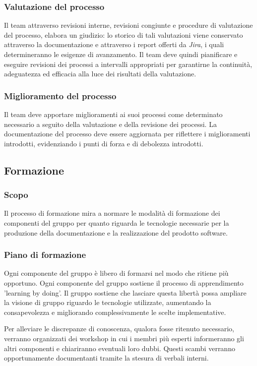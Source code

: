 \documentclass[10pt, a4paper]{article}
\begin{document}
\subsubsection{Valutazione del processo}
Il team attraverso revisioni interne, revisioni congiunte e procedure di valutazione del processo, elabora un giudizio: lo storico di tali valutazioni
viene conservato attraverso la documentazione e attraverso i report offerti da \textit{Jira}, i quali determineranno le esigenze di avanzamento.
Il team deve quindi pianificare e eseguire revisioni dei processi a intervalli appropriati per garantirne la continuità, adeguatezza ed efficacia alla 
luce dei risultati della valutazione.

\subsubsection{Miglioramento del processo}
Il team deve apportare miglioramenti ai suoi processi come determinato necessario a seguito della valutazione e della revisione dei processi.
La documentazione del processo deve essere aggiornata per riflettere i miglioramenti introdotti, evidenziando i punti di forza e di debolezza introdotti.

\subsection{Formazione}
\subsubsection{Scopo}
Il processo di formazione mira a normare le modalità di formazione dei componenti del gruppo per quanto riguarda le tecnologie necessarie per la produzione della documentazione e la realizzazione del prodotto software.

\subsubsection{Piano di formazione}
Ogni componente del gruppo è libero di formarsi nel modo che ritiene più opportuno.
Ogni componente del gruppo sostiene il processo di apprendimento 'learning by doing'.
Il gruppo sostiene che lasciare questa libertà possa ampliare la visione di gruppo riguardo le tecnologie utilizzate, aumentando la consapevolezza e migliorando complessivamente le scelte implementative.

Per alleviare le discrepanze di conoscenza, qualora fosse ritenuto necessario, verranno organizzati dei workshop in cui i membri più esperti informeranno gli altri componenti e chiariranno eventuali loro dubbi.
Questi scambi verranno opportunamente documentanti tramite la stesura di verbali interni.
\end{document}
